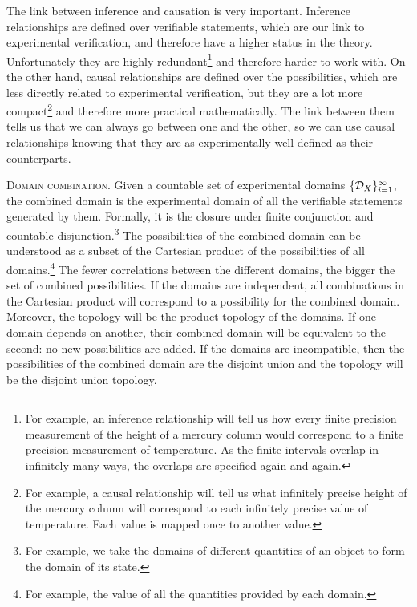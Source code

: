 \documentclass[10pt,twocolumn, nofootinbib]{revtex4-1}
\newcommand\partitle[1]{\textsc{#1}.}
\begin{document}
The link between inference and causation is very important. Inference relationships are defined over verifiable statements, which are our link to experimental verification, and therefore have a higher status in the theory. Unfortunately they are highly redundant\footnote{For example, an inference relationship will tell us how every finite precision measurement of the height of a mercury column would correspond to a finite precision measurement of temperature. As the finite intervals overlap in infinitely many ways, the overlaps are specified again and again.} and therefore harder to work with. On the other hand, causal relationships are defined over the possibilities, which are less directly related to experimental verification, but they are a lot more compact\footnote{For example, a causal relationship will tell us what infinitely precise height of the mercury column will correspond to each infinitely precise value of temperature. Each value is mapped once to another value.} and therefore more practical mathematically. The link between them tells us that we can always go between one and the other, so we can use causal relationships knowing that they are as experimentally well-defined as their counterparts.

\partitle{Domain combination} Given a countable set of experimental domains $\{\mathcal{D}_X\}_{i=1}^{\infty}$, the combined domain is the experimental domain of all the verifiable statements generated by them. Formally, it is the closure under finite conjunction and countable disjunction.\footnote{For example, we take the domains of different quantities of an object to form the domain of its state.} The possibilities of the combined domain can be understood as a subset of the Cartesian product of the possibilities of all domains.\footnote{For example, the value of all the quantities provided by each domain.} The fewer correlations between the different domains, the bigger the set of combined possibilities. If the domains are independent, all combinations in the Cartesian product will correspond to a possibility for the combined domain. Moreover, the topology will be the product topology of the domains. If one domain depends on another, their combined domain will be equivalent to the second: no new possibilities are added. If the domains are incompatible, then the possibilities of the combined domain are the disjoint union and the topology will be the disjoint union topology.
\end{document}
